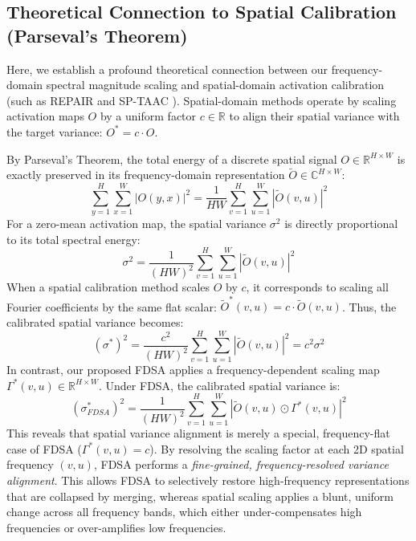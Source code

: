 \documentclass{article}
\begin{document}
\subsection{Theoretical Connection to Spatial Calibration (Parseval's Theorem)}
Here, we establish a profound theoretical connection between our frequency-domain spectral magnitude scaling and spatial-domain activation calibration (such as REPAIR \citep{jordan2022re} and SP-TAAC \citep{submission8}). Spatial-domain methods operate by scaling activation maps $O$ by a uniform factor $c \in \mathbb{R}$ to align their spatial variance with the target variance: $O^* = c \cdot O$.

By Parseval's Theorem, the total energy of a discrete spatial signal $O \in \mathbb{R}^{H \times W}$ is exactly preserved in its frequency-domain representation $\tilde{O} \in \mathbb{C}^{H \times W}$:
\begin{equation}
    \sum_{y=1}^H \sum_{x=1}^W | O(y,x) |^2 = \frac{1}{HW} \sum_{v=1}^H \sum_{u=1}^W | \tilde{O}(v,u) |^2
\end{equation}
For a zero-mean activation map, the spatial variance $\sigma^2$ is directly proportional to its total spectral energy:
\begin{equation}
    \sigma^2 = \frac{1}{(HW)^2} \sum_{v=1}^H \sum_{u=1}^W | \tilde{O}(v,u) |^2
\end{equation}
When a spatial calibration method scales $O$ by $c$, it corresponds to scaling all Fourier coefficients by the same flat scalar: $\tilde{O}^*(v,u) = c \cdot \tilde{O}(v,u)$. Thus, the calibrated spatial variance becomes:
\begin{equation}
    (\sigma^*)^2 = \frac{c^2}{(HW)^2} \sum_{v=1}^H \sum_{u=1}^W | \tilde{O}(v,u) |^2 = c^2 \sigma^2
\end{equation}
In contrast, our proposed FDSA applies a frequency-dependent scaling map $\Gamma^*(v,u) \in \mathbb{R}^{H \times W}$. Under FDSA, the calibrated spatial variance is:
\begin{equation}
    (\sigma_{FDSA}^*)^2 = \frac{1}{(HW)^2} \sum_{v=1}^H \sum_{u=1}^W \left| \tilde{O}(v,u) \odot \Gamma^*(v,u) \right|^2
\end{equation}
This reveals that spatial variance alignment is merely a special, frequency-flat case of FDSA ($\Gamma^*(v,u) = c$). By resolving the scaling factor at each 2D spatial frequency $(v,u)$, FDSA performs a \textit{fine-grained, frequency-resolved variance alignment}. This allows FDSA to selectively restore high-frequency representations that are collapsed by merging, whereas spatial scaling applies a blunt, uniform change across all frequency bands, which either under-compensates high frequencies or over-amplifies low frequencies.
\end{document}
